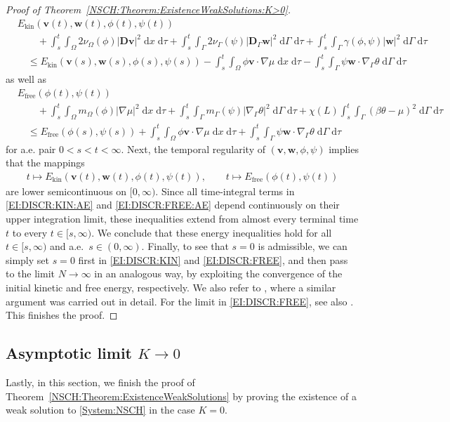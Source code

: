 \documentclass[11pt,reqno]{amsart}
\theoremstyle{remark}
\numberwithin{equation}{section}
\newcommand{\abs}[1]{|#1|}
\newcommand{\intO}{\int_\Omega}
\newcommand{\intG}{\int_\Gamma}
\newcommand{\dxtau}{\;\mathrm{d}x\;\mathrm{d}\tau}
\newcommand{\dGtau}{\;\mathrm{d}\Ga\;\mathrm{d}\tau}
\newcommand{\Grad}{\nabla}
\newcommand{\Gradg}{\nabla_\Ga}
\newcommand{\Om}{\Omega}
\newcommand{\Ga}{\Gamma}
\newcommand{\bv}{\mathbf v}
\newcommand{\bw}{\mathbf w}
\newcommand{\D}{\mathbf D}
\newcommand{\Dg}{\mathbf D_\Ga}
\newcommand{\free}{\mathrm{free}}
\begin{document}
\begin{proof}[Proof of Theorem~\ref{NSCH:Theorem:ExistenceWeakSolutions:K>0}]
\begin{align}\label{EI:DISCR:KIN:AE}
    &E_\mathrm{kin}(\bv(t),\bw(t),\phi(t),\psi(t)) \nonumber \\
    &\qquad + \int_s^t\intO2\nu_\Om(\phi)\abs{\D\bv}^2\dxtau + \int_s^t\intG 2\nu_\Ga(\psi)\abs{\Dg\bw}^2\dGtau + \int_s^t\intG \gamma(\phi,\psi)\abs{\bw}^2\dGtau \nonumber \\
    &\quad\leq E_\mathrm{kin}(\bv(s),\bw(s),\phi(s),\psi(s)) - \int_s^t\intO \phi\bv\cdot\Grad\mu\dxtau - \int_s^t\intG\psi\bw\cdot\Gradg\theta\dGtau
\end{align}
as well as
\begin{align}\label{EI:DISCR:FREE:AE}
    &E_\free(\phi(t),\psi(t)) \nonumber \\
    &\qquad + \int_s^t\intO m_\Om(\phi)\abs{\Grad\mu}^2\dxtau + \int_s^t\intG m_\Ga(\psi)\abs{\Gradg\theta}^2\dGtau \nonumber + \chi(L)\int_s^t\intG (\beta\theta-\mu)^2\dGtau \nonumber \\
    &\quad\leq E_\free(\phi(s),\psi(s)) + \int_s^t\intO \phi\bv\cdot\Grad\mu\dxtau + \int_s^t\intG \psi\bw\cdot\Gradg\theta\dGtau
\end{align}
for a.e. pair $0 < s < t < \infty$. Next, the temporal regularity of $(\bv,\bw,\phi,\psi)$ implies that the mappings
\begin{align*}
    t\mapsto E_\mathrm{kin}(\bv(t),\bw(t),\phi(t),\psi(t)), \qquad t\mapsto E_\free(\phi(t),\psi(t))
\end{align*}
are lower semicontinuous on $[0,\infty)$. Since all time-integral terms in \eqref{EI:DISCR:KIN:AE} and \eqref{EI:DISCR:FREE:AE} depend continuously on their upper integration limit, these inequalities extend from almost every terminal time $t$ to every $t\in[s,\infty)$. We conclude that these energy inequalities hold for all $t\in[s,\infty)$ and a.e.~$s\in(0,\infty)$. Finally, to see that $s = 0$ is admissible, we can simply set $s = 0$ first in \eqref{EI:DISCR:KIN} and \eqref{EI:DISCR:FREE}, and then pass to the limit $N\rightarrow\infty$ in an analogous way, by exploiting the convergence of the initial kinetic and free energy, respectively. We also refer to \cite[Theorem~3.8, 5.7.7]{Abels2025}, where a similar argument was carried out in detail. For the limit in \eqref{EI:DISCR:FREE}, see also \cite[Theorem~3.2]{Knopf2024}. This finishes the proof.
\end{proof}


\subsection{Asymptotic limit \texorpdfstring{$K\rightarrow 0$}{K->0}}
\label{Section:NSCH:K=0}
Lastly, in this section, we finish the proof of Theorem~\ref{NSCH:Theorem:ExistenceWeakSolutions} by proving the existence of a weak solution to \eqref{System:NSCH} in the case $K = 0$.
\end{document}
